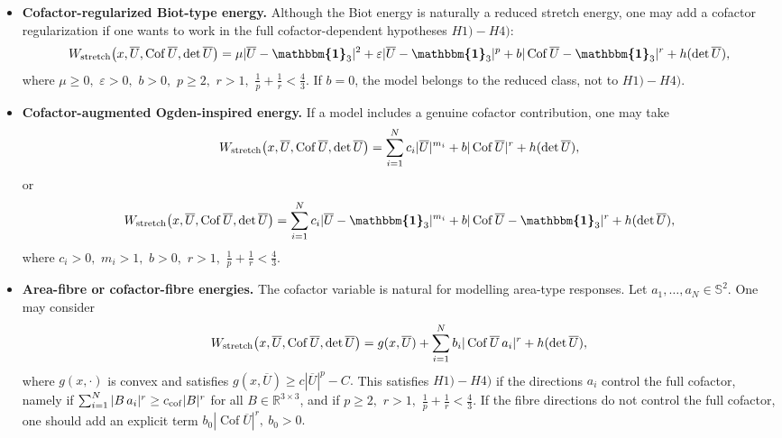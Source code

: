 \documentclass[11pt]{article}
\newcommand{\id}{{\boldsymbol{\mathbbm{1}}}}
\DeclareMathOperator{\Cof}{Cof}
\begin{document}
\begin{footnotesize}
\begin{itemize}
\item \textbf{Cofactor-regularized Biot-type energy.}
Although the Biot energy is naturally a reduced stretch energy, one may add a
cofactor regularization if one wants to work in the full cofactor-dependent
hypotheses $H1)-H4)$:
\begin{align}
        W_{\rm stretch}\bigl(x,\overline U,\Cof \overline U,\det \overline U\bigr)
        =
        \mu  | \overline U-\id_3 | ^2
        +
        \varepsilon  | \overline U-\id_3 | ^p
        +
        b | \Cof \overline U  -\id_3| ^r
        +
        h(\det \overline U),
\end{align}
where
$
        \mu\geq0,
            $ $
        \varepsilon>0,
            $ $
        b>0,
              $ $
        p\geq2,
          $ $
        r>1,
           $ $
        \frac1p+\frac1r<\frac43.
$
If $b=0$, the model belongs to the reduced class, not to $H1)-H4)$.

\item \textbf{Cofactor-augmented Ogden-inspired energy.}
If a model includes a genuine cofactor contribution, one may take
\begin{align}
        W_{\rm stretch}\bigl(x,\overline U,\Cof \overline U,\det \overline U\bigr)
        =
        \sum_{i=1}^N c_i  | \overline U | ^{m_i}
        +
        b | \Cof \overline U | ^r
        +
        h(\det \overline U),
\end{align}
or
\begin{align}
        W_{\rm stretch}\bigl(x,\overline U,\Cof \overline U,\det\overline  U\bigr)
        =
        \sum_{i=1}^N c_i  | \overline U-\id_3 | ^{m_i}
        +
        b | \Cof \overline U-\id_3 | ^r
        +
        h(\det \overline U),
\end{align}
where
$
        c_i>0,
             $ $
    m_i>1,
         $ $
        b>0,
         $ $
        r>1,
      $ $
        \frac1p+\frac1r<\frac43.
$

\item \textbf{Area-fibre or cofactor-fibre  energies.}
The cofactor variable is natural for modelling area-type responses. Let
$a_1,\ldots,a_N\in\mathbb S^2$. One may consider
\begin{align}
        W_{\rm stretch}\bigl(x,\overline U,\Cof \overline U,\det \overline U\bigr)
        =
        g(x,\overline  U)
        +
        \sum_{i=1}^N b_i | \Cof \overline U\,a_i | ^r
        +
        h(\det \overline U),
\end{align}
where $g(x,\cdot)$ is convex and satisfies
$
        g(x,\overline U)\geq c|\overline U|^p-C.
$
This satisfies $H1)-H4)$ if the directions $a_i$ control the full cofactor,
namely if
$
        \sum_{i=1}^N  | B\,a_i | ^r
        \geq
        c_{\rm cof} | B | ^r
$
for all $B\in  \mathbb{R}^{3\times 3}$, and if
$
        p\geq2,
      $ $
        r>1,
         $ $
        \frac1p+\frac1r<\frac43.
$
If the fibre directions do not control the full cofactor, one should add an
explicit term
$
        b_0 | \Cof \overline U | ^r,
        \  b_0>0.
$


\end{itemize}
\end{footnotesize}
\end{document}
